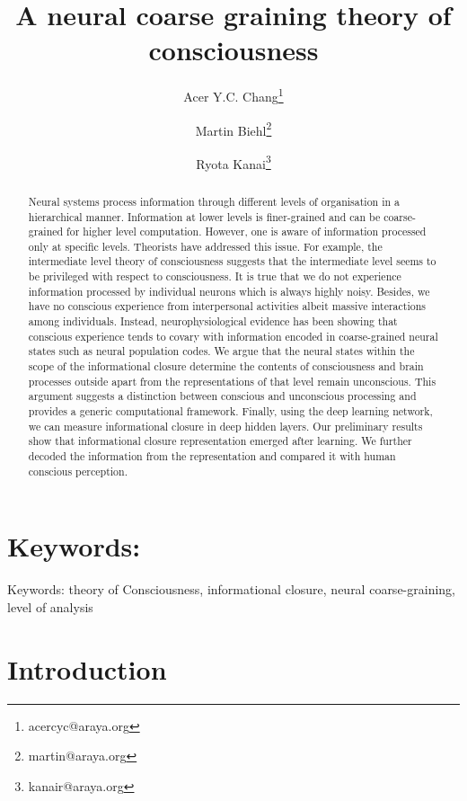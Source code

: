 \documentclass[utf8]{article}
\title{A neural coarse graining theory of consciousness}
\author[1]{Acer Y.C. Chang\thanks{acercyc@araya.org}}
\author[1]{Martin Biehl\thanks{martin@araya.org}}
\author[1]{Ryota Kanai\thanks{kanair@araya.org }}
\affil[1]{ARAYA, Inc., Tokyo, Japan}
\begin{document}
	\maketitle
	\tableofcontents


	\begin{abstract}
		Neural systems process information through different levels of organisation in a hierarchical manner. Information at lower levels is finer-grained and can be coarse-grained for higher level computation. However, one is aware of information processed only at specific levels. Theorists have addressed this issue. For example, the intermediate level theory of consciousness suggests that the intermediate level seems to be privileged with respect to consciousness. It is true that we do not experience information processed by individual neurons which is always highly noisy. Besides, we have no conscious experience from interpersonal activities albeit massive interactions among individuals. Instead, neurophysiological evidence has been showing that conscious experience tends to covary with information encoded in coarse-grained neural states such as neural population codes. We argue that the neural states within the scope of the informational closure determine the contents of consciousness and brain processes outside apart from the representations of that level remain unconscious. This argument suggests a distinction between conscious and unconscious processing and provides a generic computational framework. Finally, using the deep learning network, we can measure informational closure in deep hidden layers. Our preliminary results show that informational closure representation emerged after learning. We further decoded the information from the representation and compared it with human conscious perception.
	\end{abstract}
	
	
	\section*{Keywords:} 
	Keywords: theory of Consciousness, informational closure, neural coarse-graining, level of analysis
	
	
	
	\section{Introduction}
	
\end{document}
